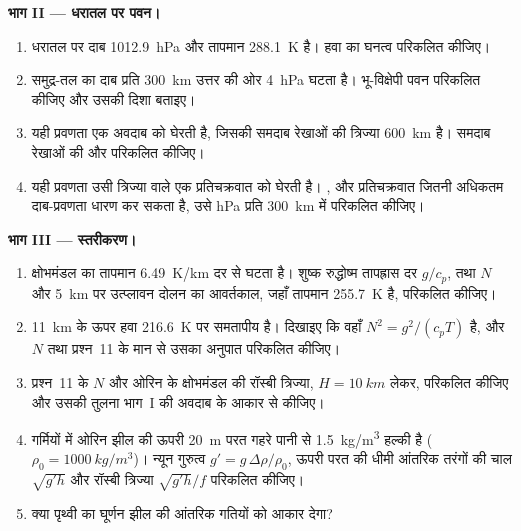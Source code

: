 \begin{problem}
\medskip\noindent\textbf{भाग II --- धरातल पर पवन।}
\begin{enumerate}[resume]
\item धरातल पर दाब \qty{1012.9}{hPa} और तापमान
  \qty{288.1}{K} है। हवा का घनत्व परिकलित कीजिए।
\item समुद्र-तल का दाब प्रति
  \qty{300}{km} उत्तर की ओर \qty{4}{hPa} घटता है। भू-विक्षेपी पवन परिकलित कीजिए और उसकी दिशा बताइए।
\item यही प्रवणता एक अवदाब को घेरती है, जिसकी समदाब रेखाओं की त्रिज्या
  \qty{600}{km} है। समदाब रेखाओं की  और 
  परिकलित कीजिए।
\item यही प्रवणता उसी त्रिज्या वाले एक प्रतिचक्रवात को घेरती है।
  , और प्रतिचक्रवात जितनी अधिकतम दाब-प्रवणता धारण कर सकता है, उसे
  \unit{hPa} प्रति \qty{300}{km} में परिकलित कीजिए।
\end{enumerate}

\medskip\noindent\textbf{भाग III --- स्तरीकरण।}
\begin{enumerate}[resume]
\item क्षोभमंडल का तापमान \qty{6.49}{K/km} दर से घटता है।
  शुष्क रुद्धोष्म तापह्रास दर $g/c_p$, तथा $N$ और
  \qty{5}{km} पर उत्प्लावन दोलन का आवर्तकाल, जहाँ तापमान
  \qty{255.7}{K} है, परिकलित कीजिए।
\item \qty{11}{km} के ऊपर हवा \qty{216.6}{K} पर समतापीय है। दिखाइए कि
  वहाँ $N^2 = g^2/(c_pT)$ है, और $N$ तथा
  प्रश्न~11 के मान से उसका अनुपात परिकलित कीजिए।
\item प्रश्न~11 के $N$ और ओरिन के क्षोभमंडल की रॉस्बी त्रिज्या,
  $H = \qty{10}{km}$ लेकर, परिकलित कीजिए और उसकी तुलना
  भाग~I की अवदाब के आकार से कीजिए।
\item गर्मियों में ओरिन झील की ऊपरी \qty{20}{m} परत गहरे पानी से
  \qty{1.5}{kg/m^3} हल्की है ($\rho_0 = \qty{1000}{kg/m^3}$)। न्यून गुरुत्व
  $g' = g\,\Delta\rho/\rho_0$, ऊपरी परत की धीमी आंतरिक तरंगों की
  चाल $\sqrt{g'h}$ और रॉस्बी त्रिज्या
  $\sqrt{g'h}/f$ परिकलित कीजिए।
\item क्या पृथ्वी का घूर्णन झील की आंतरिक गतियों को आकार देगा?
\end{enumerate}


\end{problem}
